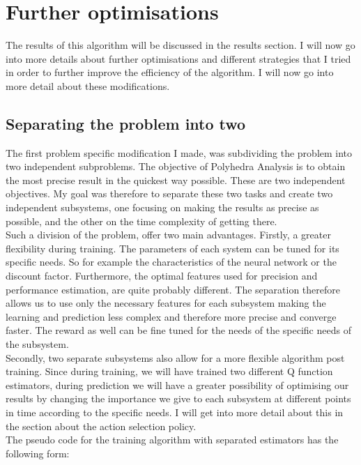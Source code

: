 \section{Further optimisations}
The results of this algorithm will be discussed in the results section. I will now go into more details about further optimisations and different strategies that I tried in order to further improve the efficiency of the algorithm. I will now go into more detail about these modifications.

\subsection{Separating the problem into two}
The first problem specific modification I made, was subdividing the problem into two independent subproblems. The objective of Polyhedra Analysis is to obtain the most precise result in the quickest way possible. These are two independent objectives. My goal was therefore to separate these two tasks and create two independent subsystems, one focusing on making the results as precise as possible, and the other on the time complexity of getting there.\\
 Such a division of the problem, offer two main advantages. Firstly, a greater flexibility during training. The parameters of each system can be tuned for its specific needs. So for example the characteristics of the neural network or the discount factor. Furthermore, the optimal features used for precision and performance estimation, are quite probably different. The separation therefore allows us to use only the necessary features for each subsystem making the learning and prediction less complex and therefore more precise and converge faster. The reward as well can be fine tuned for the needs of the specific needs of the subsystem.\\ 
 Secondly, two separate subsystems also allow for a more flexible algorithm post training. Since during training, we will have trained two different Q function estimators, during prediction we will have a greater possibility of optimising our results by changing the importance we give to each subsystem at different points in time according to the specific needs. I will get into more detail about this in the section about the action selection policy.\\
 The pseudo code for the training algorithm with separated estimators has the following form:


